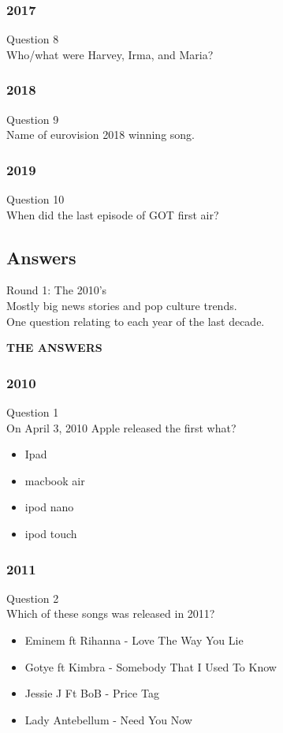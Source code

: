 \documentclass{beamer}
\begin{document}
\begin{frame}
\frametitle{2017}
Question 8\\
Who/what were Harvey, Irma, and Maria?

\end{frame}

\begin{frame}
\frametitle{2018}
Question 9\\
Name of eurovision 2018 winning song.

\end{frame}


\begin{frame}
\frametitle{2019}
Question 10\\
When did the last episode of GOT first air?

\end{frame}



\subsection{Answers}



\begin{frame}
\centering
\Huge
Round 1: The 2010's\\
\large
Mostly big news stories and pop culture trends.\\
\small
One question relating to each year of the last decade.


\Large
\textbf{THE ANSWERS}
\end{frame}



\begin{frame}
\frametitle{2010}
Question 1\\
On April 3, 2010 Apple released the first what?
\begin{itemize}
\item Ipad  \checkmark
\item macbook air
\item ipod nano
\item ipod touch
\end{itemize}
\end{frame}


\begin{frame}
\frametitle{2011}
Question 2\\
Which of these songs was released in 2011?
\begin{itemize}
\item Eminem ft Rihanna - Love The Way You Lie
\item Gotye ft Kimbra - Somebody That I Used To Know
\item Jessie J Ft BoB - Price Tag \checkmark
\item  Lady Antebellum - Need You Now
\end{itemize}


\end{frame}
\end{document}
